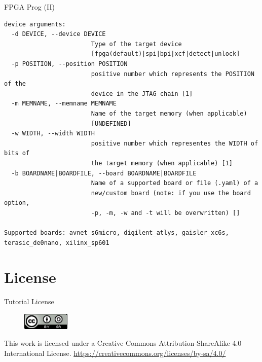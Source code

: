 \documentclass{beamer}
\begin{document}
\begin{frame}[fragile]{FPGA Prog (II)}
  \tiny
  \begin{verbatim}
device arguments:
  -d DEVICE, --device DEVICE
                        Type of the target device
                        [fpga(default)|spi|bpi|xcf|detect|unlock]
  -p POSITION, --position POSITION
                        positive number which represents the POSITION of the
                        device in the JTAG chain [1]
  -m MEMNAME, --memname MEMNAME
                        Name of the target memory (when applicable)
                        [UNDEFINED]
  -w WIDTH, --width WIDTH
                        positive number which representes the WIDTH of bits of
                        the target memory (when applicable) [1]
  -b BOARDNAME|BOARDFILE, --board BOARDNAME|BOARDFILE
                        Name of a supported board or file (.yaml) of a
                        new/custom board (note: if you use the board option,
                        -p, -m, -w and -t will be overwritten) []

Supported boards: avnet_s6micro, digilent_atlys, gaisler_xc6s,
terasic_de0nano, xilinx_sp601
  \end{verbatim}
\end{frame}


\section{License}

\begin{frame}{Tutorial License}
  \begin{figure}[!t]
    \includegraphics[width=0.2\textwidth]{../images/cc-by-sa.png}
  \end{figure}
  \centering
  This work is licensed under a Creative Commons Attribution-ShareAlike 4.0 International License.
  \url{https://creativecommons.org/licenses/by-sa/4.0/}
\end{frame}
\end{document}
